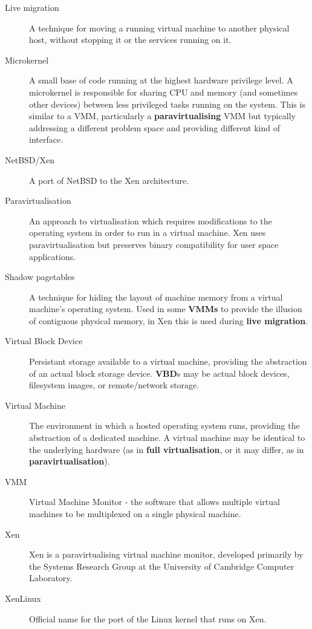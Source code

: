 \begin{description}
\item[Live migration] A technique for moving a running virtual machine
  to another physical host, without stopping it or the services
  running on it.

\item[Microkernel] A small base of code running at the highest
  hardware privilege level.  A microkernel is responsible for sharing
  CPU and memory (and sometimes other devices) between less privileged
  tasks running on the system.  This is similar to a VMM, particularly
  a {\bf paravirtualising} VMM but typically addressing a different
  problem space and providing different kind of interface.

\item[NetBSD/Xen] A port of NetBSD to the Xen architecture.

\item[Paravirtualisation] An approach to virtualisation which requires
  modifications to the operating system in order to run in a virtual
  machine.  Xen uses paravirtualisation but preserves binary
  compatibility for user space applications.

\item[Shadow pagetables] A technique for hiding the layout of machine
  memory from a virtual machine's operating system.  Used in some {\bf
  VMMs} to provide the illusion of contiguous physical memory, in
  Xen this is used during {\bf live migration}.

\item[Virtual Block Device] Persistant storage available to a virtual
  machine, providing the abstraction of an actual block storage device.
  {\bf VBD}s may be actual block devices, filesystem images, or
  remote/network storage.

\item[Virtual Machine] The environment in which a hosted operating
  system runs, providing the abstraction of a dedicated machine.  A
  virtual machine may be identical to the underlying hardware (as in
  {\bf full virtualisation}, or it may differ, as in {\bf
  paravirtualisation}).

\item[VMM] Virtual Machine Monitor - the software that allows multiple
  virtual machines to be multiplexed on a single physical machine.

\item[Xen] Xen is a paravirtualising virtual machine monitor,
  developed primarily by the Systems Research Group at the University
  of Cambridge Computer Laboratory.

\item[XenLinux] Official name for the port of the Linux kernel that
  runs on Xen.

\end{description}
